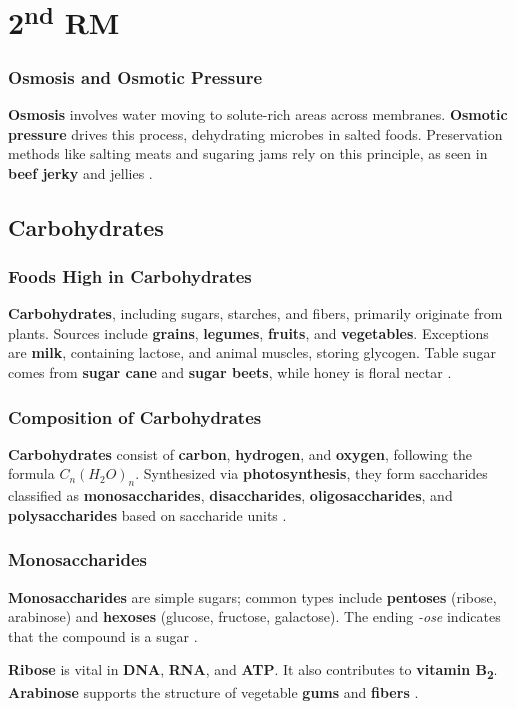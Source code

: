 \section{2\texorpdfstring{\textsuperscript{nd}}{nd} RM}
\subsubsection*{Osmosis and Osmotic Pressure}
\textbf{Osmosis} involves water moving to solute-rich areas across membranes. \textbf{Osmotic pressure} drives this process, dehydrating microbes in salted foods. Preservation methods like salting meats and sugaring jams rely on this principle, as seen in \textbf{beef jerky} and jellies \cite*{BKR_02}.

\subsection*{Carbohydrates}
\subsubsection*{Foods High in Carbohydrates}
\textbf{Carbohydrates}, including sugars, starches, and fibers, primarily originate from plants. Sources include \textbf{grains}, \textbf{legumes}, \textbf{fruits}, and \textbf{vegetables}. Exceptions are \textbf{milk}, containing lactose, and animal muscles, storing glycogen. Table sugar comes from \textbf{sugar cane} and \textbf{sugar beets}, while honey is floral nectar \cite*{BKR_02}.

\subsubsection*{Composition of Carbohydrates}
\textbf{Carbohydrates} consist of \textbf{carbon}, \textbf{hydrogen}, and \textbf{oxygen}, following the formula $C_n(H_2O)_n$. Synthesized via \textbf{photosynthesis}, they form saccharides classified as \textbf{monosaccharides}, \textbf{disaccharides}, \textbf{oligosaccharides}, and \textbf{polysaccharides} based on saccharide units \cite*{BKR_02}.

\subsubsection*{Monosaccharides}
\textbf{Monosaccharides} are simple sugars; common types include \textbf{pentoses} (ribose, arabinose) and \textbf{hexoses} (glucose, fructose, galactose). The ending \textit{-ose} indicates that the compound is a sugar \cite*{BKR_02}.

\textbf{Ribose} is vital in \textbf{DNA}, \textbf{RNA}, and \textbf{ATP}. It also contributes to \textbf{vitamin B\textsubscript{2}}. \textbf{Arabinose} supports the structure of vegetable \textbf{gums} and \textbf{fibers} \cite*{BKR_02}.


